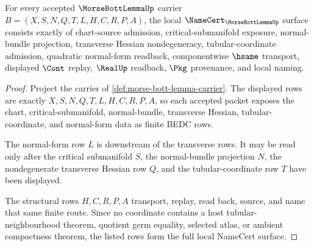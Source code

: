 \begin{theorem}
\label{thm:morse-bott-lemma-namecert-obligations}
For every accepted $\MorseBottLemmaUp$ carrier $B=(X,S,N,Q,T,L,H,C,R,P,A)$, the local $\NameCert_{\MorseBottLemmaUp}$ surface consists exactly of chart-source admission, critical-submanifold exposure, normal-bundle projection, transverse Hessian nondegeneracy, tubular-coordinate admission, quadratic normal-form readback, componentwise $\hsame$ transport, displayed $\Cont$ replay, $\RealUp$ readback, $\Pkg$ provenance, and local naming.
\end{theorem}
\begin{proof}
Project the carrier of \autoref{def:morse-bott-lemma-carrier}. The displayed rows are exactly $X,S,N,Q,T,L,H,C,R,P,A$, so each accepted packet exposes the chart, critical-submanifold, normal-bundle, transverse Hessian, tubular-coordinate, and normal-form data as finite BEDC rows.

The normal-form row $L$ is downstream of the transverse rows. It may be read only after the critical submanifold $S$, the normal-bundle projection $N$, the nondegenerate transverse Hessian row $Q$, and the tubular-coordinate row $T$ have been displayed.

The structural rows $H,C,R,P,A$ transport, replay, read back, source, and name that same finite route. Since no coordinate contains a host tubular-neighbourhood theorem, quotient germ equality, selected atlas, or ambient compactness theorem, the listed rows form the full local NameCert surface.
\end{proof}

